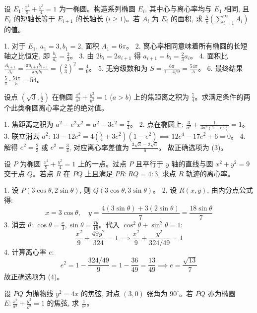 \begin{questions}
\question
设 $E_1 : \frac{x^2}{9} + \frac{y^2}{4} = 1$ 为一椭圆。构造系列椭圆 $E_i$, 其中心与离心率均与 $E_1$ 相同, 且 $E_i$ 的短轴长等于 $E_{i+1}$ 的长轴长 ($i \ge 1$)。若 $A_i$ 为 $E_i$ 的面积, 求 $\frac{5}{\pi} \left( \sum_{i=1}^{\infty} A_i \right)$ 的值。

\begin{solution}
1. 对于 $E_1$, $a_1=3, b_1=2$, 面积 $A_1 = 6\pi$。
2. 离心率相同意味着所有椭圆的长短轴之比恒定, 即 $\frac{b_i}{a_i} = \frac{2}{3}$。
3. 由 $2b_i = 2a_{i+1}$ 得 $a_{i+1} = b_i = \frac{2}{3}a_i$。
4. 面积比 $\frac{A_{i+1}}{A_i} = \frac{\pi a_{i+1} b_{i+1}}{\pi a_i b_i} = (\frac{2}{3})^2 = \frac{4}{9}$。
5. 无穷级数和为 $S = \frac{6\pi}{1 - 4/9} = \frac{54\pi}{5}$。
6. 最终结果 $\frac{5}{\pi} \cdot \frac{54\pi}{5} = 54$。
\end{solution}

\question
设点 $(\sqrt{3}, \frac{1}{2})$ 在椭圆 $\frac{x^2}{a^2} + \frac{y^2}{b^2} = 1$ ($a > b$) 上的焦距离之积为 $\frac{7}{4}$。求满足条件的两个此类椭圆离心率之差的绝对值。

\begin{solution}
1. 焦距离之积为 $a^2 - e^2x^2 = a^2 - 3e^2 = \frac{7}{4}$。
2. 点在椭圆上: $\frac{3}{a^2} + \frac{1}{4a^2(1-e^2)} = 1$。
3. 联立消去 $a^2$: $13 - 12e^2 = 4(\frac{7}{4} + 3e^2)(1 - e^2) \implies 12e^4 - 17e^2 + 6 = 0$。
4. 解得 $e^2 = \frac{2}{3}$ 或 $e^2 = \frac{3}{4}$, 对应离心率差值为 $\frac{3\sqrt{3}-2\sqrt{6}}{6}$。
故正确选项为 (3)。
\end{solution}

\question
设 $P$ 为椭圆 $\frac{x^2}{9} + \frac{y^2}{4} = 1$ 上的一点。过点 $P$ 且平行于 $y$ 轴的直线与圆 $x^2 + y^2 = 9$ 交于点 $Q$。若点 $R$ 在 $PQ$ 上且满足 $PR : RQ = 4 : 3$, 求点 $R$ 轨迹的离心率。

\begin{solution}
1. 设 $P(3\cos\theta, 2\sin\theta)$, 则 $Q(3\cos\theta, 3\sin\theta)$。
2. 设 $R(x, y)$, 由内分点公式得:
\[ x = 3\cos\theta, \quad y = \frac{4(3\sin\theta) + 3(2\sin\theta)}{7} = \frac{18\sin\theta}{7} \]
3. 消去 $\theta$: $\cos\theta = \frac{x}{3}, \sin\theta = \frac{7y}{18}$。代入 $\cos^2\theta + \sin^2\theta = 1$:
\[ \frac{x^2}{9} + \frac{49y^2}{324} = 1 \implies \frac{x^2}{9} + \frac{y^2}{324/49} = 1 \]
4. 计算离心率 $e$:
\[ e^2 = 1 - \frac{324/49}{9} = 1 - \frac{36}{49} = \frac{13}{49} \implies e = \frac{\sqrt{13}}{7} \]
故正确选项为 (4)。
\end{solution}

\question
设 $PQ$ 为抛物线 $y^2 = 4x$ 的焦弦, 对点 $(3,0)$ 张角为 $90^\circ$。若 $PQ$ 亦为椭圆 $E: \frac{x^2}{a^2} + \frac{y^2}{b^2} = 1$ 的焦弦, 求 $\frac{1}{e^2}$。


\end{questions}
